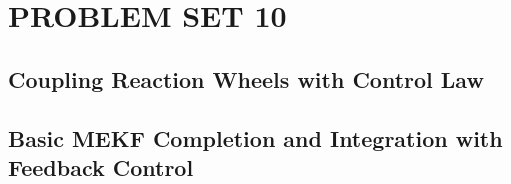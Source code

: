 \section{\Large PROBLEM SET 10}

\subsection{Coupling Reaction Wheels with Control Law}

\subsection{Basic MEKF Completion and Integration with Feedback Control}

